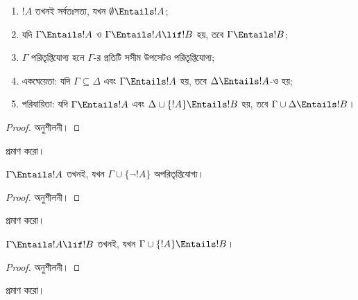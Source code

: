 \documentclass[../../../include/open-logic-section]{subfiles}
\begin{document}
\begin{prop}
\begin{enumerate}
\item $!A$ তখনই সর্বতঃসত্য, যখন
  $\emptyset \Entails !A$;
\item যদি $\Gamma \Entails !A$ ও $\Gamma \Entails !A \lif !B$ হয়,
  তবে $\Gamma \Entails !B$;
\item $\Gamma$ পরিতৃপ্তিযোগ্য হলে $\Gamma$-র প্রতিটি সসীম উপসেটও
  পরিতৃপ্তিযোগ্য;
\item {} একঘেয়েতা: যদি $\Gamma \subseteq \Delta$
  এবং $\Gamma \Entails !A$ হয়, তবে $\Delta \Entails !A$-ও হয়;
\item {} পরিযায়িতা: যদি $\Gamma \Entails !A$ এবং
  $\Delta \cup \{ !A\} \Entails !B$ হয়, তবে $\Gamma \cup \Delta \Entails
  !B$।
\end{enumerate}
\end{prop}

\begin{proof}
অনুশীলনী।
\end{proof}

\begin{prob}
 প্রমাণ করো।
\end{prob}

\begin{prop}
  $\Gamma \Entails !A$ তখনই, যখন $\Gamma \cup \{\lnot !A\}$
  অপরিতৃপ্তিযোগ্য।
\end{prop}

\begin{proof}
অনুশীলনী।
\end{proof}

\begin{prob}
 প্রমাণ করো।
\end{prob}

\begin{thm}
   $\Gamma \Entails !A \lif !B$ তখনই,
  যখন $\Gamma \cup \{!A\} \Entails !B$।
\end{thm}

\begin{proof}
অনুশীলনী।
\end{proof}

\begin{prob}
 প্রমাণ করো।
\end{prob}
\end{document}
